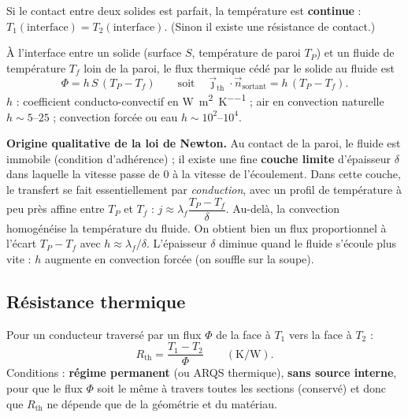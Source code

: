 \documentclass[11pt,a4paper]{article}
\newcommand{\jth}{\vec{\jmath}_{\mathrm{th}}}
\begin{document}
\begin{formule}[title={Contact thermique parfait}]
Si le contact entre deux solides est parfait, la température est \textbf{continue} :
$T_1(\text{interface})=T_2(\text{interface})$. (Sinon il existe une résistance de contact.)
\end{formule}

\begin{formule}[title={Loi de Newton (conducto-convective)}]
À l'interface entre un solide (surface $S$, température de paroi $T_P$) et un fluide de
température $T_f$ loin de la paroi, le flux thermique cédé par le solide au fluide est
\[ \boxed{\Phi=h\,S\,(T_P-T_f)}\qquad\text{soit}\quad
   \jth\cdot\vec n_{\text{sortant}}=h\,(T_P-T_f). \]
$h$ : coefficient conducto-convectif en \si{\watt\per\square\metre\per\kelvin} ;
air en convection naturelle $h\sim 5$--$25$ ; convection forcée ou eau
$h\sim 10^2$--$10^4$.
\end{formule}

\textbf{Origine qualitative de la loi de Newton.} Au contact de la paroi, le fluide est
immobile (condition d'adhérence) ; il existe une fine \textbf{couche limite} d'épaisseur
$\delta$ dans laquelle la vitesse passe de $0$ à la vitesse de l'écoulement. Dans cette couche,
le transfert se fait essentiellement par \emph{conduction}, avec un profil de température à
peu près affine entre $T_P$ et $T_f$ :
$j\approx\lambda_f\dfrac{T_P-T_f}{\delta}$. Au-delà, la convection homogénéise la température
du fluide. On obtient bien un flux proportionnel à l'écart $T_P-T_f$ avec
$h\approx\lambda_f/\delta$. L'épaisseur $\delta$ diminue quand le fluide s'écoule plus vite :
$h$ augmente en convection forcée (on souffle sur la soupe).

\subsection{Résistance thermique}

\begin{formule}[title={Définition et conditions d'utilisation}]
Pour un conducteur traversé par un flux $\Phi$ de la face à $T_1$ vers la face à $T_2$ :
\[ \boxed{R_{\mathrm{th}}=\dfrac{T_1-T_2}{\Phi}}\qquad(\si{\kelvin\per\watt}). \]
Conditions : \textbf{régime permanent} (ou ARQS thermique), \textbf{sans source interne},
pour que le flux $\Phi$ soit le même à travers toutes les sections (conservé) et donc que
$R_{\mathrm{th}}$ ne dépende que de la géométrie et du matériau.
\end{formule}
\end{document}
